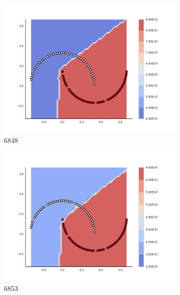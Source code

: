\begin{figure}[h]
\begin{subfigure}[b]{0.09\textwidth}
    \includegraphics[clip, trim=2.35cm 1.75cm 4.5cm 0cm,width=\textwidth]{img/convergence/6848.pdf}
    \caption{6848}
    \label{fig:convergence_6848}
\end{subfigure}
%
\begin{subfigure}[b]{0.09\textwidth}
    \includegraphics[clip, trim=2.35cm 1.75cm 4.5cm 0cm,width=\textwidth]{img/convergence/6853.pdf}
    \caption{6853}
    \label{fig:convergence_6853}
\end{subfigure}
%
\begin{subfigure}[b]{0.09\textwidth}

\end{subfigure}
\end{figure}

